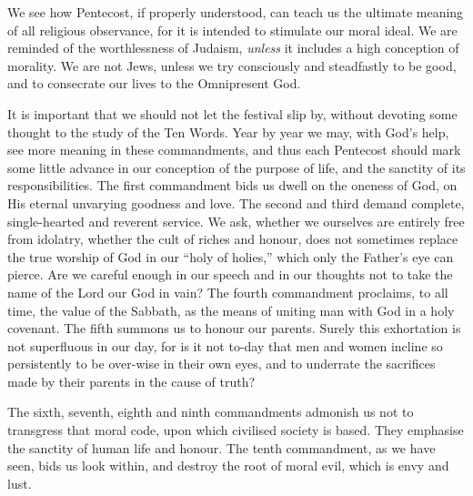 We see how Pentecost, if properly understood,
can teach us the ultimate meaning of
all religious observance, for it is intended
to stimulate our moral ideal. We are
reminded of the worthlessness of Judaism,
\textsl{unless} it includes a high conception of
morality. We are not Jews, unless we try
consciously and steadfastly to be good, and to
consecrate our lives to the Omnipresent God.

It is important that we should not let the
festival slip by, without devoting some
thought to the study of the Ten Words.
Year by year we may, with God’s help, see
more meaning in these commandments, and
thus each Pentecost should mark some little
advance in our conception of the purpose of
life, and the sanctity of its responsibilities.
The first commandment bids us dwell on the
oneness of God, on His eternal unvarying
goodness and love. The second and third
demand complete, single-hearted and reverent
service. We ask, whether we ourselves are
entirely free from idolatry, whether the cult
of riches and honour, does not sometimes
replace the true worship of God in our “holy
of holies,” which only the Father’s eye can
pierce. Are we careful enough in our
speech and in our thoughts not to take the
name of the Lord our God in vain? The
fourth commandment proclaims, to all time,
the value of the Sabbath, as the means of
uniting man with God in a holy covenant.
The fifth summons us to honour our parents.
Surely this exhortation is not superfluous in
our day, for is it not to-day that men and
women incline so persistently to be over-wise
in their own eyes, and to underrate
the sacrifices made by their parents in the
cause of truth?

The sixth, seventh, eighth and ninth
commandments admonish us not to transgress
that moral code, upon which civilised
society is based. They emphasise the
sanctity of human life and honour. The
tenth commandment, as we have seen, bids
us look within, and destroy the root of moral
evil, which is envy and lust.

